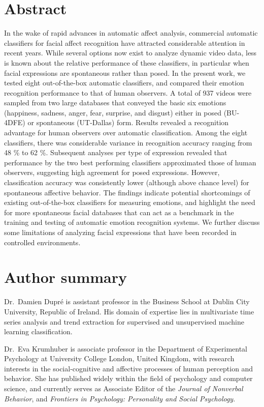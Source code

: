 \documentclass[10pt,letterpaper]{article}
\begin{document}
\section*{Abstract}
In the wake of rapid advances in automatic affect analysis, commercial automatic classifiers for facial affect recognition have attracted considerable attention in recent years. While several options now exist to analyze dynamic video data, less is known about the relative performance of these classifiers, in particular when facial expressions are spontaneous rather than posed. In the present work, we tested eight out-of-the-box automatic classifiers, and compared their emotion recognition performance to that of human observers. A total of 937 videos were sampled from two large databases that conveyed the basic six emotions (happiness, sadness, anger, fear, surprise, and disgust) either in posed (BU-4DFE) or spontaneous (UT-Dallas) form. Results revealed a recognition advantage for human observers over automatic classification. Among the eight classifiers, there was considerable variance in recognition accuracy ranging from 48 \% to 62 \%. Subsequent analyses per type of expression revealed that performance by the two best performing classifiers approximated those of human observers, suggesting high agreement for posed expressions. However, classification accuracy was consistently lower (although above chance level) for spontaneous affective behavior. The findings indicate potential shortcomings of existing out-of-the-box classifiers for measuring emotions, and highlight the need for more spontaneous facial databases that can act as a benchmark in the training and testing of automatic emotion recognition systems. We further discuss some limitations of analyzing facial expressions that have been recorded in controlled environments.

\section*{Author summary}
Dr.~Damien Dupré is assistant professor in the Business School at Dublin City University, Republic of Ireland. His domain of expertise lies in multivariate time series analysis and trend extraction for supervised and unsupervised machine learning classification.

Dr.~Eva Krumhuber is associate professor in the Department of Experimental Psychology at University College London, United Kingdom, with research interests in the social-cognitive and affective processes of human perception and behavior. She has published widely within the field of psychology and computer science, and currently serves as Associate Editor of the \emph{Journal of Nonverbal Behavior}, and \emph{Frontiers in Psychology: Personality and Social Psychology}.
\end{document}
